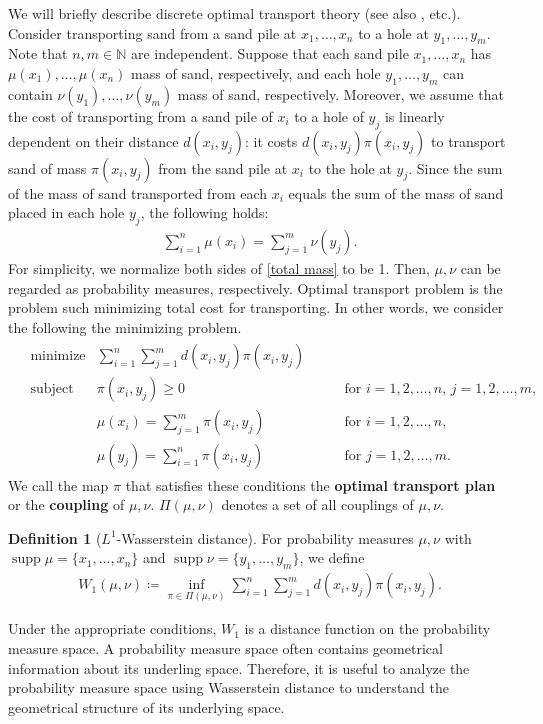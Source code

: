 \documentclass{article}
\numberwithin{equation}{section}
\theoremstyle{definition}
\newtheorem{definition}{Definition}[section]
\newcommand{\dis}{\displaystyle}
\newcommand{\N}{\mathbb{N}}
\DeclareMathOperator\supp{supp} %
\def\:={\coloneqq} %
\begin{document}
We will briefly describe discrete optimal transport theory (see also \cite{FG,Sa,Vi}, etc.).
Consider transporting sand from a sand pile at $x_1,\ldots,x_n$ to a hole at $y_1,\ldots,y_m$.
Note that $n,m\in\N$ are independent.
Suppose that each sand pile $x_1,\dots,x_n$ has $\mu(x_1),\ldots,\mu(x_n)$ mass of sand, respectively, and each hole $y_1,\dots,y_m$ can contain $\nu(y_1),\dots,\nu(y_m)$ mass of sand, respectively.
Moreover, we assume that the cost of transporting from a sand pile of $x_i$ to a hole of $y_j$ is linearly dependent on their distance $d(x_i,y_j)$: 
it costs $d(x_i,y_j)\pi(x_i,y_j)$ to transport sand of mass $\pi(x_i,y_j)$ from the sand pile at $x_i$ to the hole at $y_j$.
Since the sum of the mass of sand transported from each $x_i$ equals the sum of the mass of sand placed in each hole $y_j$, the following holds:
\begin{align}
    \dis \sum_{i=1}^n \mu(x_i) = \sum_{j=1}^m \nu(y_j). \label{total mass}
\end{align}
For simplicity, we normalize both sides of \eqref{total mass} to be 1.
Then, $\mu,\nu$ can be regarded as probability measures, respectively.
Optimal transport problem is the problem such minimizing total cost for transporting.
In other words, we consider the following the minimizing problem.
\begin{align}
\begin{aligned}
    & \text{minimize} 
        & \sum_{i=1}^n \sum_{j=1}^m d(x_i,y_j)\pi(x_i,y_j) & & \label{object func.} \\
    & \text{subject to} 
        & \pi(x_i,y_j)\ge 0 & \qquad \text{for } i=1,2,\ldots,n,\, j=1,2,\ldots,m, \\
        & & \mu(x_i)=\sum_{j=1}^m \pi(x_i,y_j) & \qquad \text{for } i=1,2,\ldots,n, \\
        & & \mu(y_j)=\sum_{i=1}^n \pi(x_i,y_j) & \qquad \text{for } j=1,2,\ldots,m. 
\end{aligned}
\end{align}
We call the map $\pi$ that satisfies these conditions the \textbf{optimal transport plan} or the \textbf{coupling} of $\mu,\nu$.
$\Pi(\mu,\nu)$ denotes a set of all couplings of $\mu,\nu$.
\begin{definition}[$L^1$-Wasserstein distance]
For probability measures $\mu,\nu$ with $\supp\mu=\{x_1,\ldots,x_n\}$ and $\supp\nu=\{y_1,\ldots,y_m\}$, we define 
\begin{align}
    W_1(\mu,\nu) \:= \inf_{\pi\in\Pi(\mu,\nu)} \sum_{i=1}^n \sum_{j=1}^m d(x_i,y_j)\pi(x_i,y_j). \label{Wasserstein}
\end{align}
\end{definition}
Under the appropriate conditions, $W_1$ is a distance function on the probability measure space.
A probability measure space often contains geometrical information about its underling space.
Therefore, it is useful to analyze the probability measure space using Wasserstein distance to understand the geometrical structure of its underlying space.
\end{document}

